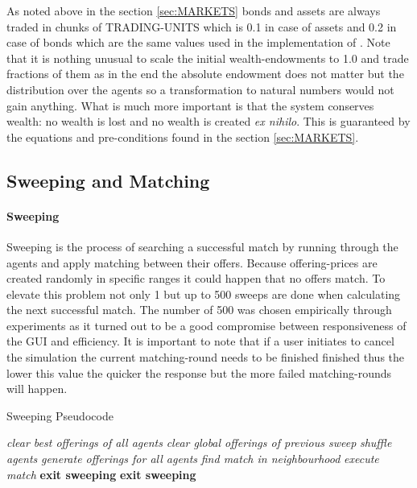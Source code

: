 \documentclass[Bachelorarbeit.tex]{subfiles}
\begin{document}
As noted above in the section \ref{sec:MARKETS} bonds and assets are always traded in chunks of TRADING-UNITS which is 0.1 in case of assets and 0.2 in case of bonds which are the same values used in the implementation of \cite{Breuer2015}. Note that it is nothing unusual to scale the initial wealth-endowments to 1.0 and trade fractions of them as in the end the absolute endowment does not matter but the distribution over the agents so a transformation to natural numbers would not gain anything. What is much more important is that the system conserves wealth: no wealth is lost and no wealth is created \textit{ex nihilo}. This is guaranteed by the equations and pre-conditions found in the section \ref{sec:MARKETS}. 

\subsection{Sweeping and Matching}
\label{sec:implementation_sweepingAndMatching}

\paragraph{Sweeping}
Sweeping is the process of searching a successful match by running through the agents and apply matching between their offers. Because offering-prices are created randomly in specific ranges it could happen that no offers match. To elevate this problem not only 1 but up to 500 sweeps are done when calculating the next successful match. The number of 500 was chosen empirically through experiments as it turned out to be a good compromise between responsiveness of the GUI and efficiency. It is important to note that if a user initiates to cancel the simulation the current matching-round needs to be finished finished thus the lower this value the quicker the response but the more failed matching-rounds will happen.

\begin{algorithm}
\caption{Sweeping Pseudocode}\label{euclid}
\begin{algorithmic}[1]
\State \textit{clear best offerings of all agents}
	\State \textit{clear global offerings of previous sweep}
	\State \textit{shuffle agents}
	\State \textit{generate offerings for all agents}
		\State \textit{find match in neighbourhood}
			\State \textit{execute match}
			\State \textbf{exit sweeping}
		\EndIf 
	\EndFor
	\State \textbf{exit sweeping}
	\EndIf
\EndWhile
\end{algorithmic}
\end{algorithm}
\end{document}
